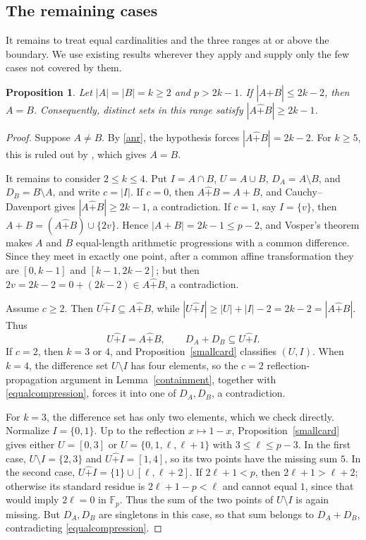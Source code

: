 \documentclass[12pt]{article}
\newtheorem{proposition}{Proposition}[section]
\theoremstyle{remark}
\newcommand{\F}{\mathbb{F}_p}
\newcommand{\rs}{\mathbin{\widehat+}}
\begin{document}
\subsection{The remaining cases}\label{remainingcases}

It remains to treat equal cardinalities and the three ranges at or above
the boundary.  We use existing results wherever they apply and supply
only the few cases not covered by them.

\begin{proposition}\label{equalprop}
Let $|A|=|B|=k\ge2$ and $p>2k-1$.  If $|A\rs B|\le2k-2$, then $A=B$.
Consequently, distinct sets in this range satisfy $|A\rs B|\ge2k-1$.
\end{proposition}
\begin{proof}
Suppose $A\ne B$.  By \eqref{anr}, the hypothesis forces
$|A\rs B|=2k-2$.  For $k\ge5$, this is ruled out by
\cite[Theorem 7]{DGHM}, which gives $A=B$.

It remains to consider $2\le k\le4$.  Put $I=A\cap B$,
$U=A\cup B$, $D_A=A\setminus B$, and $D_B=B\setminus A$, and write
$c=|I|$.  If $c=0$, then $A\rs B=A+B$, and
Cauchy--Davenport gives $|A\rs B|\ge2k-1$, a contradiction.
If $c=1$, say $I=\{v\}$, then
$A+B=(A\rs B)\cup\{2v\}$.  Hence $|A+B|=2k-1\le p-2$, and Vosper's
theorem makes $A$ and $B$ equal-length arithmetic progressions with a
common difference.  Since they meet in exactly one point, after a common
affine transformation they are $[0,k-1]$ and $[k-1,2k-2]$; but then
$2v=2k-2=0+(2k-2)\in A\rs B$, a contradiction.

Assume $c\ge2$.  Then $U\rs I\subseteq A\rs B$, while
$|U\rs I|\ge |U|+|I|-2=2k-2=|A\rs B|$.  Thus
\begin{equation}\label{equalcompression}
 U\rs I=A\rs B,
 \qquad D_A+D_B\subseteq U\rs I.
\end{equation}
If $c=2$, then $k=3$ or $4$, and Proposition~\ref{smallcard}
classifies $(U,I)$.  When $k=4$, the difference set $U\setminus I$
has four elements, so the $c=2$ reflection-propagation argument in
Lemma~\ref{containment}, together with \eqref{equalcompression},
forces it into one of $D_A,D_B$, a contradiction.

For $k=3$, the difference set has only two elements, which we check
directly.  Normalize $I=\{0,1\}$.  Up to the reflection $x\mapsto1-x$,
Proposition~\ref{smallcard} gives either $U=[0,3]$ or
$U=\{0,1,\ell,\ell+1\}$ with $3\le\ell\le p-3$.
In the first case, $U\setminus I=\{2,3\}$ and
$U\rs I=[1,4]$, so its two points have the missing sum $5$.
In the second case, $U\rs I=\{1\}\cup[\ell,\ell+2]$.
If $2\ell+1<p$, then $2\ell+1>\ell+2$; otherwise its standard
residue is $2\ell+1-p<\ell$ and cannot equal $1$, since that would
imply $2\ell=0$ in $\F$.  Thus the sum of the two points of
$U\setminus I$ is again missing.  But $D_A,D_B$ are singletons in
this case, so that sum belongs to $D_A+D_B$, contradicting
\eqref{equalcompression}.


\end{proof}
\end{document}
